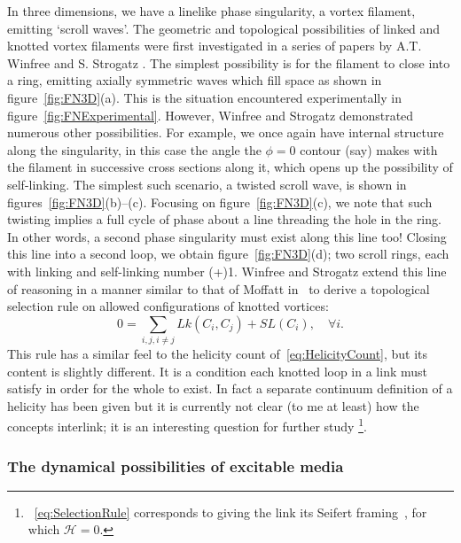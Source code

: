 In three dimensions, we have a linelike phase singularity, a vortex filament, emitting `scroll waves'. The geometric and topological possibilities of linked and knotted vortex filaments were first investigated in a series of papers by A.T. Winfree and S. Strogatz \citep{Winfree1983, Winfree1983b, Winfree1983c, Winfree1984}. The simplest possibility is for the filament to close into a ring, emitting axially symmetric waves which fill space as shown in figure~\ref{fig:FN3D}(a). This is the situation encountered experimentally in figure~\ref{fig:FNExperimental}. However, Winfree and Strogatz demonstrated numerous other possibilities. For example, we once again have internal structure along the singularity, in this case the angle the $\phi=0$ contour (say) makes with the filament in successive cross sections along it, which opens up the possibility of self-linking. The simplest such scenario, a twisted scroll wave, is shown in figures~\ref{fig:FN3D}(b)--(c). Focusing on figure~\ref{fig:FN3D}(c), we note that such twisting implies a full cycle of phase about a line threading the hole in the ring. In other words, a second phase singularity must exist along this line too! Closing this line into a second loop, we obtain figure~\ref{fig:FN3D}(d); two scroll rings, each with linking and self-linking number (+)1. Winfree and Strogatz extend this line of reasoning in a manner similar to that of Moffatt in~\citep{Moffatt1969} to derive a topological selection rule on allowed configurations of knotted vortices: 
\begin{equation}
    0 = \sum_{i,j, i\neq j} Lk(C_i,C_j) + SL(C_i), \quad \forall i. 
    \label{eq:SelectionRule}
\end{equation}
This rule has a similar feel to the helicity count of~\eqref{eq:HelicityCount}, but its content is slightly different. It is a condition each knotted loop in a link must satisfy in order for the whole to exist. In fact a separate continuum definition of a helicity has been given \citep{Trueba2009} but it is currently not clear (to me at least) how the concepts interlink; it is an interesting question for further study \footnote{~\eqref{eq:SelectionRule} corresponds to giving the link its Seifert framing~\citep{Winfree1983c,MoffattBook}, for which $\mathcal{H}=0$.}.

\subsubsection{The dynamical possibilities of excitable media}

